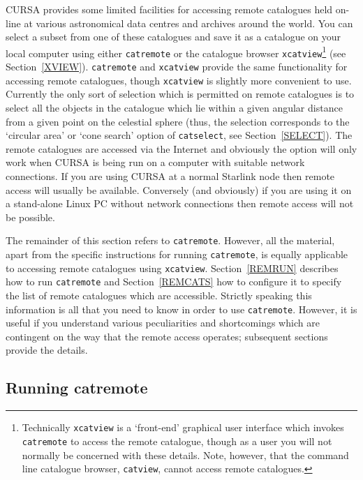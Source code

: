 \documentclass[twoside,11pt]{starlink}
\begin{document}
CURSA provides some limited facilities for accessing remote catalogues
held on-line at various astronomical data centres and archives around
the world.  You can select a subset from one of these catalogues and
save it as a catalogue on your local computer using either \texttt{catremote} or the catalogue browser \texttt{xcatview}\footnote{Technically
\texttt{xcatview} is a `front-end' graphical user interface which invokes
\texttt{catremote} to access the remote catalogue, though as a user you
will not normally be concerned with these details.  Note, however,
that the command line catalogue browser, \texttt{catview}, cannot access
remote catalogues.} (see Section~\ref{XVIEW}).  \texttt{catremote} and
\texttt{xcatview} provide the same functionality for accessing remote
catalogues, though \texttt{xcatview} is slightly more convenient to use.
Currently the only sort of selection which is permitted on remote
catalogues is to select all the objects in the catalogue which lie
within a given angular distance from a given point on the celestial
sphere (thus, the selection corresponds to the `circular area' or
`cone search' option of \texttt{catselect}, see Section~\ref{SELECT}).
The remote catalogues are accessed via the Internet and obviously the
option will only work when CURSA is being run on a computer with suitable
network connections.  If you are using CURSA at a normal Starlink node
then remote access will usually be available.  Conversely (and obviously)
if you are using it on a stand-alone Linux PC without network connections
then remote access will not be possible.

The remainder of this section refers to \texttt{catremote}.  However, all
the material, apart from the specific instructions for running
\texttt{catremote}, is equally applicable to accessing remote catalogues
using \texttt{xcatview}.  Section~\ref{REMRUN} describes how to run
\texttt{catremote} and Section~\ref{REMCATS} how to configure it to specify
the list of remote catalogues which are accessible.  Strictly speaking this
information is all that you need to know in order to use \texttt{catremote}.
However, it is useful if you understand various peculiarities and
shortcomings which are contingent on the way that the remote access
operates; subsequent sections provide the details.

\subsection{Running catremote \label{REMRUN}}
\end{document}
